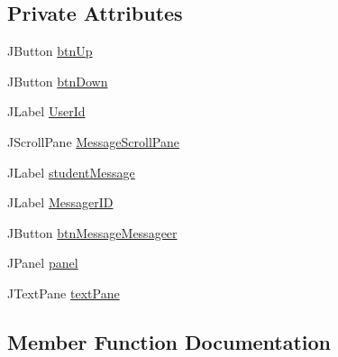 \subsection*{Private Attributes}
\begin{DoxyCompactItemize}
\item 
J\+Button \mbox{\hyperlink{classcom_1_1_b_n_u_1_1pages_1_1message__board_1_1_message_model_a4c6514b5de48a3921398615daf179550}{btn\+Up}}
\item 
J\+Button \mbox{\hyperlink{classcom_1_1_b_n_u_1_1pages_1_1message__board_1_1_message_model_a71141955061669383af5642357fc723f}{btn\+Down}}
\item 
J\+Label \mbox{\hyperlink{classcom_1_1_b_n_u_1_1pages_1_1message__board_1_1_message_model_a29f9c399689c1c0278557b512d8a28c9}{User\+Id}}
\item 
J\+Scroll\+Pane \mbox{\hyperlink{classcom_1_1_b_n_u_1_1pages_1_1message__board_1_1_message_model_af1f911b0f9cde5631ed6f83d9097bc19}{Message\+Scroll\+Pane}}
\item 
J\+Label \mbox{\hyperlink{classcom_1_1_b_n_u_1_1pages_1_1message__board_1_1_message_model_ac2fbc72420f4c1097f346f215d08014b}{student\+Message}}
\item 
J\+Label \mbox{\hyperlink{classcom_1_1_b_n_u_1_1pages_1_1message__board_1_1_message_model_acc5e6742a6b9a3552fe155f3d2677192}{Messager\+ID}}
\item 
J\+Button \mbox{\hyperlink{classcom_1_1_b_n_u_1_1pages_1_1message__board_1_1_message_model_a3733ef347e6881264132c4613369f3cf}{btn\+Message\+Messageer}}
\item 
J\+Panel \mbox{\hyperlink{classcom_1_1_b_n_u_1_1pages_1_1message__board_1_1_message_model_a6066901665c43ce5125901e2db42ec93}{panel}}
\item 
J\+Text\+Pane \mbox{\hyperlink{classcom_1_1_b_n_u_1_1pages_1_1message__board_1_1_message_model_a3dcf1aebf699a590c57664bf1a999348}{text\+Pane}}
\end{DoxyCompactItemize}


\subsection{Member Function Documentation}
\mbox{\label{classcom_1_1_b_n_u_1_1pages_1_1message__board_1_1_message_model_ad90183139c715302ad514feb5e607e02}} 
